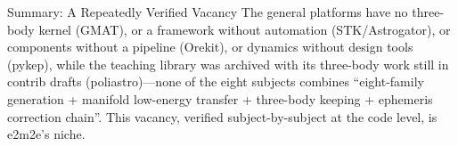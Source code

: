 \begin{keybox}{Summary: A Repeatedly Verified Vacancy}
The general platforms have no three-body kernel (GMAT), or a framework
without automation (STK/Astrogator), or components without a pipeline
(Orekit), or dynamics without design tools (pykep), while the teaching
library was archived with its three-body work still in contrib drafts
(poliastro)---none of the eight subjects combines ``eight-family generation
+ manifold low-energy transfer + three-body keeping + ephemeris correction
chain''. This vacancy, verified subject-by-subject at the code level, is
e2m2e's niche.
\end{keybox}

